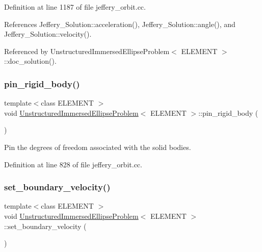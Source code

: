 Definition at line 1187 of file jeffery\+\_\+orbit.\+cc.



References Jeffery\+\_\+\+Solution\+::acceleration(), Jeffery\+\_\+\+Solution\+::angle(), and Jeffery\+\_\+\+Solution\+::velocity().



Referenced by Unstructured\+Immersed\+Ellipse\+Problem$<$ E\+L\+E\+M\+E\+N\+T $>$\+::doc\+\_\+solution().

\mbox{\label{classUnstructuredImmersedEllipseProblem_a07dc16909c0223fe4b656fd270f27c11}} 
\subsubsection{\texorpdfstring{pin\+\_\+rigid\+\_\+body()}{pin\_rigid\_body()}}
{\footnotesize\ttfamily template$<$class E\+L\+E\+M\+E\+NT $>$ \\
void \hyperlink{classUnstructuredImmersedEllipseProblem}{Unstructured\+Immersed\+Ellipse\+Problem}$<$ E\+L\+E\+M\+E\+NT $>$\+::pin\+\_\+rigid\+\_\+body (\begin{DoxyParamCaption}{ }\end{DoxyParamCaption})\hspace{0.3cm}{\ttfamily [private]}}



Pin the degrees of freedom associated with the solid bodies. 



Definition at line 828 of file jeffery\+\_\+orbit.\+cc.

\mbox{\label{classUnstructuredImmersedEllipseProblem_ab201b187b240105fd8d444d943f6dada}} 
\subsubsection{\texorpdfstring{set\+\_\+boundary\+\_\+velocity()}{set\_boundary\_velocity()}}
{\footnotesize\ttfamily template$<$class E\+L\+E\+M\+E\+NT $>$ \\
void \hyperlink{classUnstructuredImmersedEllipseProblem}{Unstructured\+Immersed\+Ellipse\+Problem}$<$ E\+L\+E\+M\+E\+NT $>$\+::set\+\_\+boundary\+\_\+velocity (\begin{DoxyParamCaption}{ }\end{DoxyParamCaption})}



